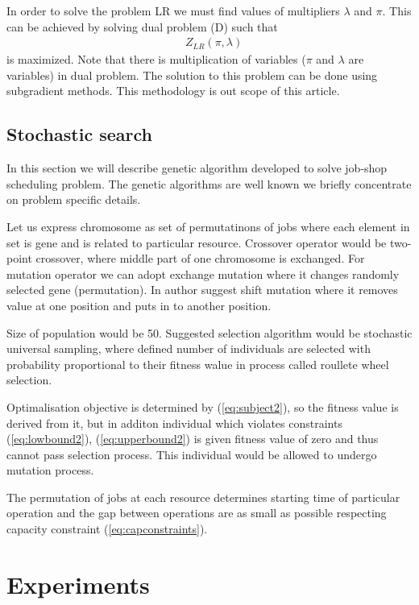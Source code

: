 \documentclass[a4paper,journal,twocolumn]{IEEEtran}
\begin{document}
In order to solve the problem LR we must find values of multipliers $\lambda$ and $\pi$. This can be achieved by
solving dual problem (D) such that 
\begin{align}
	& Z_{LR}\left(\pi,\lambda\right)\nonumber
\end{align}
is maximized.
Note that there is multiplication of variables ($\pi$ and $\lambda$ are variables) in dual problem.
The solution to this problem can be done using subgradient methods. This methodology is out scope of this article.

\subsection{Stochastic search}
In this section we will describe genetic algorithm developed to solve job-shop scheduling problem.
The genetic algorithms are well known we briefly concentrate on problem specific details.

Let us express chromosome as set of permutatinons of jobs where each element in set is gene and is related to particular resource.
Crossover operator would be two-point crossover, where middle part of one chromosome is exchanged.
For mutation operator we can adopt exchange mutation where it changes randomly selected gene (permutation). In \cite{Sed} author suggest
shift mutation where it removes value at one position and puts in to another position.

Size of population would be 50. Suggested selection algorithm would be stochastic universal sampling, where defined number of individuals
are selected with probability proportional to their fitness walue in process called roullete wheel selection.

Optimalisation objective is determined by (\ref{eq:subject2}), so the fitness value is derived from it, but in additon
individual which violates constraints (\ref{eq:lowbound2}), (\ref{eq:upperbound2}) is given fitness value of zero
and thus cannot pass selection process. This individual would be allowed to undergo mutation process.

The permutation of jobs at each resource determines starting time of particular operation 
and the gap between operations are as small as possible respecting capacity constraint (\ref{eq:capconstraints}).

\section{Experiments}
\end{document}
